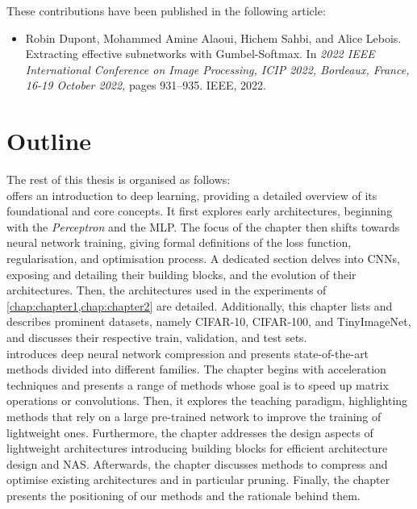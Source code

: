 \noindent These contributions have been published in the following article:
\begin{itemize}
      \item Robin Dupont, Mohammed Amine Alaoui, Hichem Sahbi, and Alice
            Lebois. Extracting effective subnetworks with Gumbel-Softmax. In \textit{2022
                  IEEE International Conference on Image Processing, ICIP 2022, Bordeaux,
                  France, 16-19 October 2022,} pages 931–935. IEEE, 2022.\\
\end{itemize}

\section{Outline}

The rest of this thesis is organised as follows:\\

 offers an introduction to deep learning, providing a detailed
overview of its foundational and core concepts. It first explores early
architectures, beginning with the \emph{Perceptron} and the \ac{MLP}. The focus
of the chapter then shifts towards neural network training, giving formal
definitions of the loss function, regularisation, and optimisation process. A
dedicated section delves into \aclp{CNN}, exposing and detailing their building
blocks, and the evolution of their architectures. Then, the architectures used
in the experiments of \cref{chap:chapter1,chap:chapter2} are detailed.
Additionally, this chapter lists and describes prominent datasets, namely
CIFAR-10, CIFAR-100, and TinyImageNet, and discusses their respective train,
validation, and test sets.\\

 introduces deep neural network compression and presents
state-of-the-art methods divided into different families. The chapter begins
with acceleration techniques and presents a range of methods whose goal is to
speed up matrix operations or convolutions. Then, it explores the teaching
paradigm, highlighting methods that rely on a large pre-trained network to
improve the training of lightweight ones. Furthermore, the chapter addresses the
design aspects of lightweight architectures introducing building blocks for
efficient architecture design and \acl{NAS}. Afterwards, the chapter discusses
methods to compress and optimise existing architectures and in particular
pruning. Finally, the chapter presents the positioning of our methods and the
rationale behind them.\\

